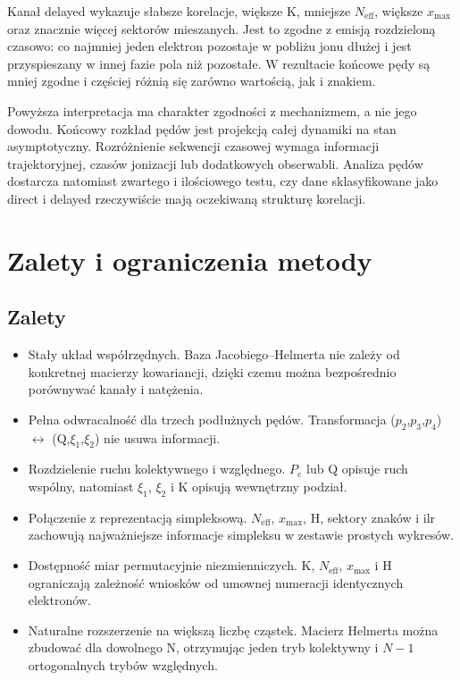 \documentclass[12pt,letterpaper,oneside]{report}
\numberwithin{equation}{chapter}
\numberwithin{figure}{chapter}
\numberwithin{table}{chapter}
\newcommand{\Pe}{\ensuremath{P_e}}
\newcommand{\Neff}{\ensuremath{N_{\mathrm{eff}}}}
\newcommand{\xmax}{\ensuremath{x_{\max}}}
\begin{document}
Kanał delayed wykazuje słabsze korelacje, większe K, mniejsze \Neff{},
większe \xmax{} oraz znacznie więcej sektorów mieszanych. Jest to zgodne
z emisją rozdzieloną czasowo: co najmniej jeden elektron pozostaje w
pobliżu jonu dłużej i jest przyspieszany w innej fazie pola niż
pozostałe. W rezultacie końcowe pędy są mniej zgodne i częściej różnią
się zarówno wartością, jak i znakiem.

Powyższa interpretacja ma charakter zgodności z mechanizmem, a nie jego
dowodu. Końcowy rozkład pędów jest projekcją całej dynamiki na stan
asymptotyczny. Rozróżnienie sekwencji czasowej wymaga informacji
trajektoryjnej, czasów jonizacji lub dodatkowych obserwabli. Analiza
pędów dostarcza natomiast zwartego i ilościowego testu, czy dane
sklasyfikowane jako direct i delayed rzeczywiście mają oczekiwaną
strukturę korelacji.

\section{Zalety i ograniczenia metody}

\subsection{Zalety}

\begin{itemize}
\item
  Stały układ współrzędnych. Baza Jacobiego--Helmerta nie zależy od
  konkretnej macierzy kowariancji, dzięki czemu można bezpośrednio
  porównywać kanały i natężenia.
\item
  Pełna odwracalność dla trzech podłużnych pędów. Transformacja
  (\ensuremath{p_2},\ensuremath{p_3},\ensuremath{p_4}) \ensuremath{\leftrightarrow} (Q,\ensuremath{\xi_1},\ensuremath{\xi_2}) nie usuwa informacji.
\item
  Rozdzielenie ruchu kolektywnego i względnego. \Pe{} lub Q opisuje ruch
  wspólny, natomiast \ensuremath{\xi_1}, \ensuremath{\xi_2} i K opisują wewnętrzny podział.
\item
  Połączenie z reprezentacją simpleksową. \Neff{}, \xmax{}, H, sektory
  znaków i ilr zachowują najważniejsze informacje simpleksu w zestawie
  prostych wykresów.
\item
  Dostępność miar permutacyjnie niezmienniczych. K, \Neff{}, \xmax{} i H
  ograniczają zależność wniosków od umownej numeracji identycznych
  elektronów.
\item
  Naturalne rozszerzenie na większą liczbę cząstek. Macierz Helmerta
  można zbudować dla dowolnego N, otrzymując jeden tryb kolektywny i \ensuremath{N-1}
  ortogonalnych trybów względnych.
\end{itemize}
\end{document}
